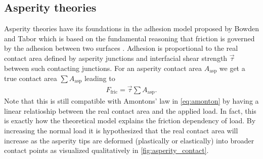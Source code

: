 \subsection{Asperity theories} %

Asperity theories have its foundations in the adhesion model proposed by Bowden and Tabor \cite{bowden2001friction} which is based on the fundamental reasoning that friction is governed by the adhesion between two surfaces \cite{Kim_2012}. Adhesion is proportional to the real contact area defined by asperity junctions and interfacial shear strength $\vec{\tau}$ between such contacting junctions. For an asperity contact area $A_{\text{asp}}$ we get a true contact area $\sum A_{\text{asp}}$ leading to 
\begin{align*}
  F_\text{fric} = \vec{\tau} \sum A_{\text{asp}}.
\end{align*}
Note that this is still compatible with Amontons’ law in \cref{eq:amonton} by having a linear relatioship between the real contact area and the
applied load. In fact, this is exactly how the theoretical model explains the friction dependency of load. By increasing the normal load it is hypothesized that the real contact area will increase as the asperity tips are deformed (plastically or elastically) into broader contact points as visualized qualitatively in \cref{fig:asperity_contact}.

